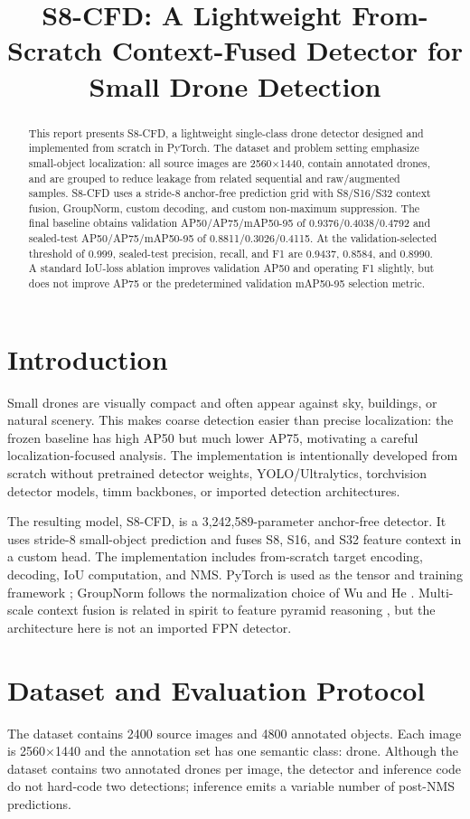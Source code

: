 \documentclass[conference]{IEEEtran}
\title{S8-CFD: A Lightweight From-Scratch Context-Fused Detector for Small Drone Detection}
\author{\IEEEauthorblockN{Hardefa Rogonondo}}
\begin{document}
\maketitle

\begin{abstract}
This report presents S8-CFD, a lightweight single-class drone detector designed
and implemented from scratch in PyTorch. The dataset and problem setting
emphasize small-object localization: all source images are 2560$\times$1440,
contain annotated drones, and are grouped to reduce leakage from related
sequential and raw/augmented samples. S8-CFD uses a stride-8 anchor-free prediction grid with S8/S16/S32
context fusion, GroupNorm, custom decoding, and custom non-maximum suppression.
The final baseline obtains validation AP50/AP75/mAP50-95 of
0.9376/0.4038/0.4792 and sealed-test AP50/AP75/mAP50-95 of
0.8811/0.3026/0.4115. At the validation-selected threshold of 0.999, sealed-test
precision, recall, and F1 are 0.9437, 0.8584, and 0.8990. A standard IoU-loss
ablation improves validation AP50 and operating F1 slightly, but does not
improve AP75 or the predetermined validation mAP50-95 selection metric.
\end{abstract}

\section{Introduction}
Small drones are visually compact and often appear against sky, buildings, or
natural scenery. This makes coarse detection easier than precise localization:
the frozen baseline has high AP50 but much lower AP75, motivating a careful
localization-focused analysis. The implementation is intentionally developed
from scratch without pretrained detector weights, YOLO/Ultralytics, torchvision
detector models, timm backbones, or imported detection architectures.

The resulting model, S8-CFD, is a 3,242,589-parameter anchor-free detector. It
uses stride-8 small-object prediction and fuses S8, S16, and S32 feature context
in a custom head. The implementation includes from-scratch target encoding,
decoding, IoU computation, and NMS. PyTorch is used as the tensor and training
framework \cite{paszke2019pytorch}; GroupNorm follows the normalization choice
of Wu and He \cite{wu2018group}. Multi-scale context fusion is related in spirit
to feature pyramid reasoning \cite{lin2017feature}, but the architecture here is
not an imported FPN detector.

\section{Dataset and Evaluation Protocol}
The dataset contains 2400 source images and 4800 annotated objects. Each image is
2560$\times$1440 and the annotation set has one semantic class: drone. Although
the dataset contains two annotated drones per image, the detector and inference
code do not hard-code two detections; inference emits a variable number of
post-NMS predictions.
\end{document}
